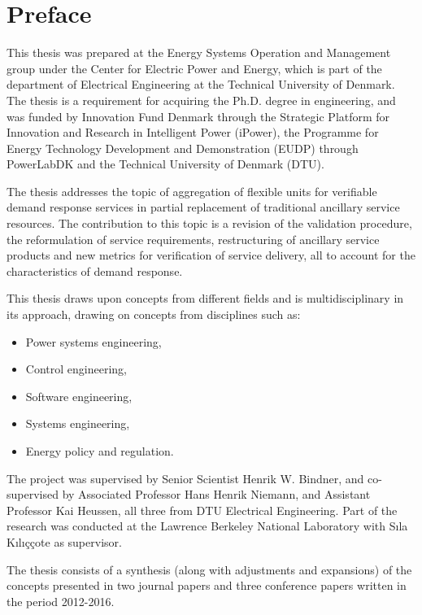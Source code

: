 \chapter{Preface}
This thesis was prepared at the Energy Systems Operation and Management group under the Center for Electric Power and Energy, which is part of the department of Electrical Engineering at the Technical University of Denmark. The thesis is a requirement for acquiring the Ph.D. degree in engineering, and was funded by Innovation Fund Denmark through the Strategic Platform for Innovation and Research in Intelligent Power (iPower), the Programme for Energy Technology Development and Demonstration (EUDP) through PowerLabDK and the Technical University of Denmark (DTU).

The thesis addresses the topic of aggregation of flexible units for verifiable demand response services in partial replacement of traditional ancillary service resources.
The contribution to this topic is a revision of the validation procedure, the reformulation of service requirements, restructuring of ancillary service products and new metrics for verification of service delivery, all to account for the characteristics of demand response.

This thesis draws upon concepts from different fields and is multidisciplinary in its approach, drawing on concepts from disciplines such as:
\begin{itemize}
	\item Power systems engineering,
	\item Control engineering,
	\item Software engineering,
	\item Systems engineering,
	\item Energy policy and regulation.
\end{itemize}

The project was supervised by Senior Scientist Henrik W. Bindner, and co-supervised by Associated Professor Hans Henrik Niemann, and Assistant Professor Kai Heussen, all three from DTU Electrical Engineering. Part of the research was conducted at the Lawrence Berkeley National Laboratory with S{\i}la K{\i}l{\i}\c{c}\c{c}ote as supervisor.

The thesis consists of a synthesis (along with adjustments and expansions) of the concepts presented in two journal papers and three conference papers written in the period 2012-2016.
\vfill

{
\centering
\begin{flushright}
    \thesisauthor{}
\end{flushright}
}
